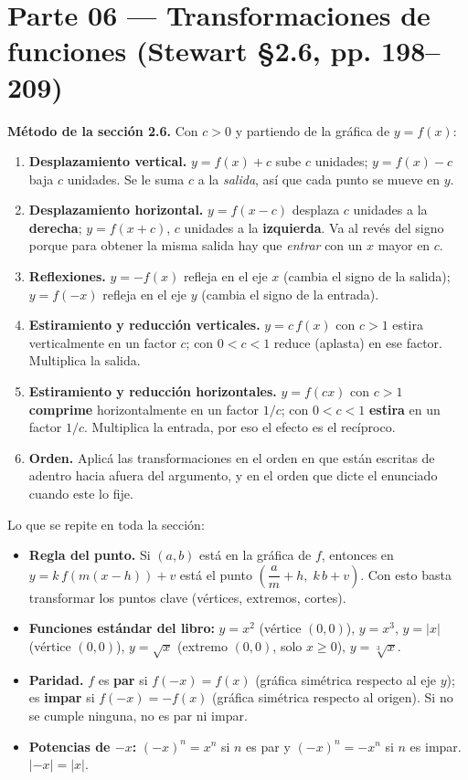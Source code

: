 \documentclass[11pt]{article}
\begin{document}
\shorthandoff{<>}  %

\section*{Parte 06 — Transformaciones de funciones (Stewart §2.6, pp. 198--209)}

\begin{teo}
\textbf{Método de la sección 2.6.} Con $c>0$ y partiendo de la gráfica de $y=f(x)$:
\begin{enumerate}[leftmargin=*]
\item \textbf{Desplazamiento vertical.} $y=f(x)+c$ sube $c$ unidades; $y=f(x)-c$ baja $c$ unidades. Se le suma $c$ a la \emph{salida}, así que cada punto se mueve en $y$.
\item \textbf{Desplazamiento horizontal.} $y=f(x-c)$ desplaza $c$ unidades a la \textbf{derecha}; $y=f(x+c)$, $c$ unidades a la \textbf{izquierda}. Va al revés del signo porque para obtener la misma salida hay que \emph{entrar} con un $x$ mayor en $c$.
\item \textbf{Reflexiones.} $y=-f(x)$ refleja en el eje $x$ (cambia el signo de la salida); $y=f(-x)$ refleja en el eje $y$ (cambia el signo de la entrada).
\item \textbf{Estiramiento y reducción verticales.} $y=c\,f(x)$ con $c>1$ estira verticalmente en un factor $c$; con $0<c<1$ reduce (aplasta) en ese factor. Multiplica la salida.
\item \textbf{Estiramiento y reducción horizontales.} $y=f(cx)$ con $c>1$ \textbf{comprime} horizontalmente en un factor $1/c$; con $0<c<1$ \textbf{estira} en un factor $1/c$. Multiplica la entrada, por eso el efecto es el recíproco.
\item \textbf{Orden.} Aplicá las transformaciones en el orden en que están escritas de adentro hacia afuera del argumento, y en el orden que dicte el enunciado cuando este lo fije.
\end{enumerate}
\end{teo}

\begin{tip}
Lo que se repite en toda la sección:
\begin{itemize}[leftmargin=*]
\item \textbf{Regla del punto.} Si $(a,b)$ está en la gráfica de $f$, entonces en $y=k\,f(m(x-h))+v$ está el punto $\left(\dfrac{a}{m}+h,\; k\,b+v\right)$. Con esto basta transformar los puntos clave (vértices, extremos, cortes).
\item \textbf{Funciones estándar del libro:} $y=x^2$ (vértice $(0,0)$), $y=x^3$, $y=|x|$ (vértice $(0,0)$), $y=\sqrt{x}$ (extremo $(0,0)$, solo $x\ge0$), $y=\sqrt[3]{x}$.
\item \textbf{Paridad.} $f$ es \textbf{par} si $f(-x)=f(x)$ (gráfica simétrica respecto al eje $y$); es \textbf{impar} si $f(-x)=-f(x)$ (gráfica simétrica respecto al origen). Si no se cumple ninguna, no es par ni impar.
\item \textbf{Potencias de $-x$:} $(-x)^n=x^n$ si $n$ es par y $(-x)^n=-x^n$ si $n$ es impar. $|-x|=|x|$.
\end{itemize}
\end{tip}
\end{document}
